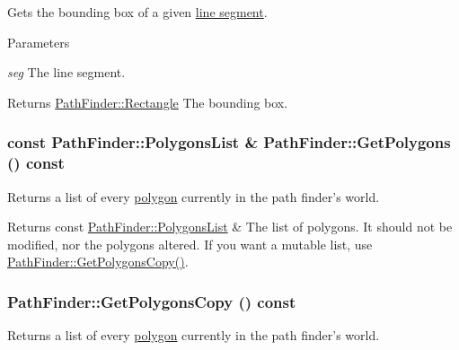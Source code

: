 Gets the bounding box of a given \hyperlink{structPathFinder_1_1Segment}{line segment}. 


\begin{DoxyParams}{Parameters}
\item[{\em seg}]The line segment. \end{DoxyParams}
\begin{DoxyReturn}{Returns}
\hyperlink{structPathFinder_1_1Rectangle}{PathFinder::Rectangle} The bounding box. 
\end{DoxyReturn}
\hypertarget{classPathFinder_a61256a9d84ff19f3471f0b22f69527e2}{
\subsubsection[{GetPolygons}]{\setlength{\rightskip}{0pt plus 5cm}const {\bf PathFinder::PolygonsList} \& PathFinder::GetPolygons () const}}
\label{classPathFinder_a61256a9d84ff19f3471f0b22f69527e2}


Returns a list of every \hyperlink{structPathFinder_1_1ConvexPolygon}{polygon} currently in the path finder's world. 

\begin{DoxyReturn}{Returns}
const \hyperlink{classPathFinder_a16ed073fa542c82fd09e582cb4fbed24}{PathFinder::PolygonsList} \& The list of polygons. It should not be modified, nor the polygons altered. If you want a mutable list, use \hyperlink{classPathFinder_a1341f2c71d9984cc73719c8d9aa6aaa2}{PathFinder::GetPolygonsCopy()}. 
\end{DoxyReturn}
\hypertarget{classPathFinder_a1341f2c71d9984cc73719c8d9aa6aaa2}{
\subsubsection[{GetPolygonsCopy}]{ PathFinder::GetPolygonsCopy () const}}
\label{classPathFinder_a1341f2c71d9984cc73719c8d9aa6aaa2}


Returns a list of every \hyperlink{structPathFinder_1_1ConvexPolygon}{polygon} currently in the path finder's world. 

